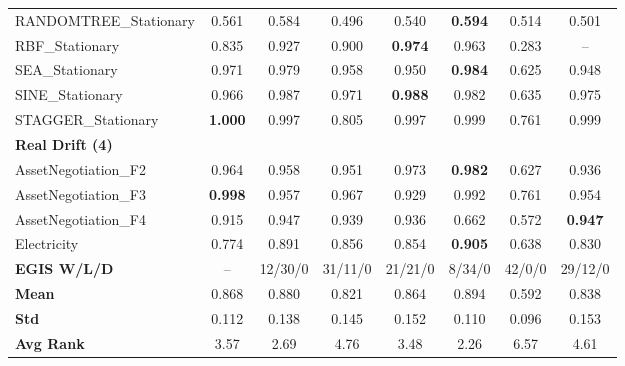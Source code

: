 \begin{table}[ht]
\begin{tabular}{l|ccccccc}
RANDOMTREE\_Stationary & 0.561 & 0.584 & 0.496 & 0.540 & \textbf{0.594} & 0.514 & 0.501 \\
RBF\_Stationary & 0.835 & 0.927 & 0.900 & \textbf{0.974} & 0.963 & 0.283 & -- \\
SEA\_Stationary & 0.971 & 0.979 & 0.958 & 0.950 & \textbf{0.984} & 0.625 & 0.948 \\
SINE\_Stationary & 0.966 & 0.987 & 0.971 & \textbf{0.988} & 0.982 & 0.635 & 0.975 \\
STAGGER\_Stationary & \textbf{1.000} & 0.997 & 0.805 & 0.997 & 0.999 & 0.761 & 0.999 \\
\multicolumn{8}{l}{\textbf{Real Drift (4)}} \\
AssetNegotiation\_F2 & 0.964 & 0.958 & 0.951 & 0.973 & \textbf{0.982} & 0.627 & 0.936 \\
AssetNegotiation\_F3 & \textbf{0.998} & 0.957 & 0.967 & 0.929 & 0.992 & 0.761 & 0.954 \\
AssetNegotiation\_F4 & 0.915 & 0.947 & 0.939 & 0.936 & 0.662 & 0.572 & \textbf{0.947} \\
Electricity & 0.774 & 0.891 & 0.856 & 0.854 & \textbf{0.905} & 0.638 & 0.830 \\
\midrule
\textbf{EGIS W/L/D} & -- & 12/30/0 & 31/11/0 & 21/21/0 & 8/34/0 & 42/0/0 & 29/12/0 \\
\textbf{Mean} & 0.868 & 0.880 & 0.821 & 0.864 & 0.894 & 0.592 & 0.838 \\
\textbf{Std} & 0.112 & 0.138 & 0.145 & 0.152 & 0.110 & 0.096 & 0.153 \\
\textbf{Avg Rank} & 3.57 & 2.69 & 4.76 & 3.48 & 2.26 & 6.57 & 4.61 \\
\bottomrule
\end{tabular}
\end{table}